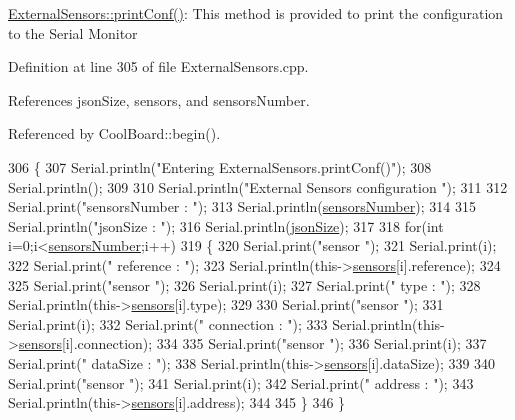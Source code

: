 \hyperlink{classExternalSensors_a78c2bf55084435dd51d3c559b2d3c6f3}{External\+Sensors\+::print\+Conf()}\+: This method is provided to print the configuration to the Serial Monitor 

Definition at line 305 of file External\+Sensors.\+cpp.



References json\+Size, sensors, and sensors\+Number.



Referenced by Cool\+Board\+::begin().


\begin{DoxyCode}
306 \{
307     Serial.println(\textcolor{stringliteral}{"Entering ExternalSensors.printConf()"});
308     Serial.println();
309 
310     Serial.println(\textcolor{stringliteral}{"External Sensors configuration "});
311 
312     Serial.print(\textcolor{stringliteral}{"sensorsNumber : "});
313     Serial.println(\hyperlink{classExternalSensors_a58e4fbf9adeae787d92be5fa33043b5d}{sensorsNumber});
314 
315     Serial.println(\textcolor{stringliteral}{"jsonSize : "});
316     Serial.println(\hyperlink{classExternalSensors_acacea86d74d967b57fcff282d26cff57}{jsonSize});
317 
318     \textcolor{keywordflow}{for}(\textcolor{keywordtype}{int} i=0;i<\hyperlink{classExternalSensors_a58e4fbf9adeae787d92be5fa33043b5d}{sensorsNumber};i++)
319     \{
320         Serial.print(\textcolor{stringliteral}{"sensor "});
321         Serial.print(i);
322         Serial.print(\textcolor{stringliteral}{" reference : "});
323         Serial.println(this->\hyperlink{classExternalSensors_a284233f884fcf00154a44740cf1d9e1e}{sensors}[i].reference);
324 
325         Serial.print(\textcolor{stringliteral}{"sensor "});
326         Serial.print(i);
327         Serial.print(\textcolor{stringliteral}{" type : "});
328         Serial.println(this->\hyperlink{classExternalSensors_a284233f884fcf00154a44740cf1d9e1e}{sensors}[i].type);
329 
330         Serial.print(\textcolor{stringliteral}{"sensor "});
331         Serial.print(i);
332         Serial.print(\textcolor{stringliteral}{" connection : "});
333         Serial.println(this->\hyperlink{classExternalSensors_a284233f884fcf00154a44740cf1d9e1e}{sensors}[i].connection);
334         
335         Serial.print(\textcolor{stringliteral}{"sensor "});
336         Serial.print(i);
337         Serial.print(\textcolor{stringliteral}{" dataSize : "});
338         Serial.println(this->\hyperlink{classExternalSensors_a284233f884fcf00154a44740cf1d9e1e}{sensors}[i].dataSize);
339         
340         Serial.print(\textcolor{stringliteral}{"sensor "});
341         Serial.print(i);
342         Serial.print(\textcolor{stringliteral}{" address : "});
343         Serial.println(this->\hyperlink{classExternalSensors_a284233f884fcf00154a44740cf1d9e1e}{sensors}[i].address);
344     
345     \}
346 \}
\end{DoxyCode}
